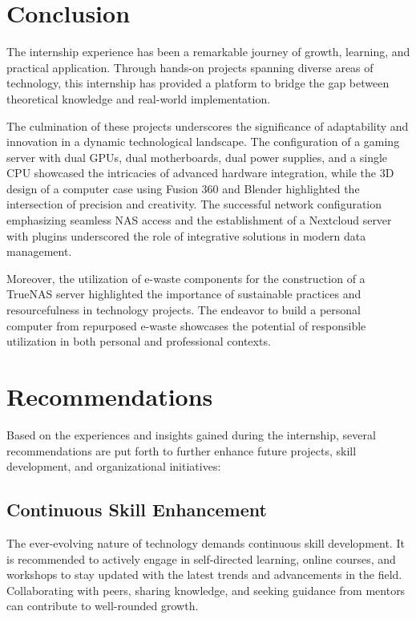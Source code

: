 \section{Conclusion}

The internship experience has been a remarkable journey of growth, learning, and practical application. Through hands-on projects spanning diverse areas of technology, this internship has provided a platform to bridge the gap between theoretical knowledge and real-world implementation.

The culmination of these projects underscores the significance of adaptability and innovation in a dynamic technological landscape. The configuration of a gaming server with dual GPUs, dual motherboards, dual power supplies, and a single CPU showcased the intricacies of advanced hardware integration, while the 3D design of a computer case using Fusion 360 and Blender highlighted the intersection of precision and creativity. The successful network configuration emphasizing seamless NAS access and the establishment of a Nextcloud server with plugins underscored the role of integrative solutions in modern data management.

Moreover, the utilization of e-waste components for the construction of a TrueNAS server highlighted the importance of sustainable practices and resourcefulness in technology projects. The endeavor to build a personal computer from repurposed e-waste showcases the potential of responsible utilization in both personal and professional contexts.

\section{Recommendations}

Based on the experiences and insights gained during the internship, several recommendations are put forth to further enhance future projects, skill development, and organizational initiatives:

\subsection{Continuous Skill Enhancement}

The ever-evolving nature of technology demands continuous skill development. It is recommended to actively engage in self-directed learning, online courses, and workshops to stay updated with the latest trends and advancements in the field. Collaborating with peers, sharing knowledge, and seeking guidance from mentors can contribute to well-rounded growth.

